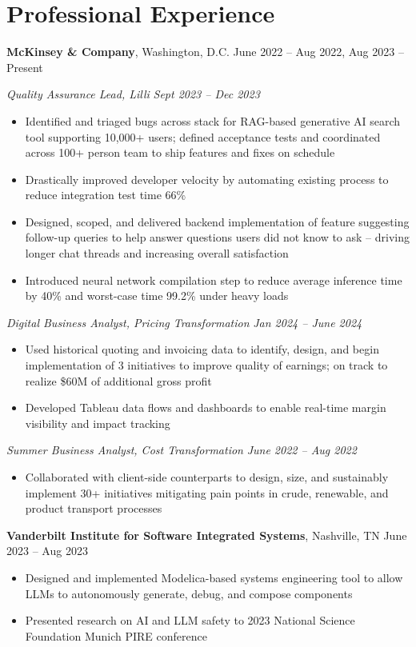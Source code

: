 \documentclass[10pt]{article}
\newcommand{\roleheader}[3]{
  \vspace{0.8ex}
  \textbf{#1}, #2 \hfill #3
}
\newcommand{\role}[4]{
  \roleheader{#1}{#2}{#3}

  #4
}
\newcommand{\itemizedrole}[5]{
  \roleheader{#1}{#2}{#3 -- #4}

  \begin{itemize}
    #5
  \end{itemize}
}
\newcommand{\subrole}[5]{
  \vspace{0.1ex}
  \textit{#1, #2} \hfill \textit{#3 -- #4}

  \begin{itemize}
    #5
  \end{itemize}
}
\begin{document}
\section*{Professional Experience}
\role
{McKinsey \& Company}
{Washington, D.C.}
{June 2022 -- Aug 2022, Aug 2023 -- Present}
{
	\subrole
	{Quality Assurance Lead}
	{Lilli}
	{Sept 2023}
	{Dec 2023}
	{
		\item Identified and triaged bugs across stack for RAG-based generative AI search tool supporting 10,000+ users; defined acceptance tests and coordinated across 100+ person team to ship features and fixes on schedule
		\item Drastically improved developer velocity by automating existing process to reduce integration test time 66\%
		\item Designed, scoped, and delivered backend implementation of feature suggesting follow-up queries to help answer questions users did not know to ask – driving longer chat threads and increasing overall satisfaction
		\item Introduced neural network compilation step to reduce average inference time by 40\% and worst-case time 99.2\% under heavy loads
	}

	\subrole
	{Digital Business Analyst}
	{Pricing Transformation}
	{Jan 2024}
	{June 2024}
	{
		\item Used historical quoting and invoicing data to identify, design, and begin implementation of 3 initiatives to improve quality of earnings; on track to realize \$60M of additional gross profit
		\item Developed Tableau data flows and dashboards to enable real-time margin visibility and impact tracking
	}

	\subrole
	{Summer Business Analyst}
	{Cost Transformation}
	{June 2022}
	{Aug 2022}
	{
		\item Collaborated with client-side counterparts to design, size, and sustainably implement 30+ initiatives mitigating pain points in crude, renewable, and product transport processes

	}
}

\itemizedrole
{Vanderbilt Institute for Software Integrated Systems}
{Nashville, TN}
{June 2023}
{Aug 2023}
{

	\item Designed and implemented Modelica-based systems engineering tool to allow LLMs to autonomously generate, debug, and compose components
	\item Presented research on AI and LLM safety to 2023 National Science Foundation Munich PIRE conference
}
\end{document}
